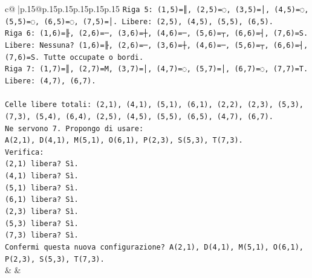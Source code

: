 \documentclass{article}
\begin{document}
{\begin{supertabular}{c@{$\;$}|p{.15\linewidth}@{}p{.15\linewidth}p{.15\linewidth}p{.15\linewidth}p{.15\linewidth}p{.15\linewidth}}
{{{\texttt{Riga 5: (1,5)=║, (2,5)=◌, (3,5)=│, (4,5)=◌, (5,5)=◌, (6,5)=◌, (7,5)=│. Libere: (2,5), (4,5), (5,5), (6,5).} \\
\texttt{Riga 6: (1,6)=╟, (2,6)=─, (3,6)=┼, (4,6)=─, (5,6)=┬, (6,6)=┤, (7,6)=S. Libere: Nessuna? (1,6)=╟, (2,6)=─, (3,6)=┼, (4,6)=─, (5,6)=┬, (6,6)=┤, (7,6)=S. Tutte occupate o bordi.} \\
\texttt{Riga 7: (1,7)=║, (2,7)=M, (3,7)=│, (4,7)=◌, (5,7)=│, (6,7)=◌, (7,7)=T. Libere: (4,7), (6,7).} \\
\\ 
\texttt{Celle libere totali: (2,1), (4,1), (5,1), (6,1), (2,2), (2,3), (5,3), (7,3), (5,4), (6,4), (2,5), (4,5), (5,5), (6,5), (4,7), (6,7).} \\
\texttt{Ne servono 7. Propongo di usare:} \\
\texttt{A(2,1), D(4,1), M(5,1), O(6,1), P(2,3), S(5,3), T(7,3).} \\
\texttt{Verifica:} \\
\texttt{(2,1) libera? Sì.} \\
\texttt{(4,1) libera? Sì.} \\
\texttt{(5,1) libera? Sì.} \\
\texttt{(6,1) libera? Sì.} \\
\texttt{(2,3) libera? Sì.} \\
\texttt{(5,3) libera? Sì.} \\
\texttt{(7,3) libera? Sì.} \\
\texttt{Confermi questa nuova configurazione? A(2,1), D(4,1), M(5,1), O(6,1), P(2,3), S(5,3), T(7,3).} \\
            }
        }
    }
    & & \\ \\


\end{supertabular}}
\end{document}
